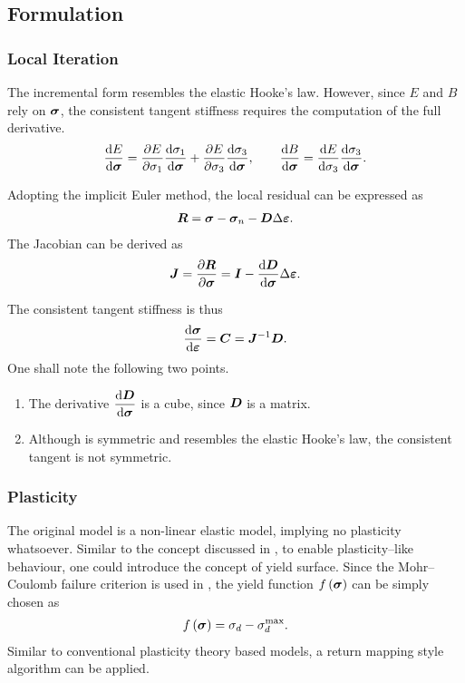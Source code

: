 \subsection{Formulation}
\subsubsection{Local Iteration}
The incremental form  resembles the elastic Hooke's law.
However, since $E$ and $B$ rely on $\bm{\sigma}$, the consistent tangent stiffness requires the computation of the full derivative.
\begin{gather}
\dfrac{\mathrm{d}E}{\mathrm{d}\bm{\sigma}}=\dfrac{\partial{E}}{\partial{\sigma_1}}\dfrac{\mathrm{d}\sigma_1}{\mathrm{d}\bm{\sigma}}+\dfrac{\partial{E}}{\partial{\sigma_3}}\dfrac{\mathrm{d}\sigma_3}{\mathrm{d}\bm{\sigma}},\qquad
\dfrac{\mathrm{d}B}{\mathrm{d}\bm{\sigma}}=\dfrac{\mathrm{d}E}{\mathrm{d}\sigma_3}\dfrac{\mathrm{d}\sigma_3}{\mathrm{d}\bm{\sigma}}.
\end{gather}

Adopting the implicit Euler method, the local residual can be expressed as
\begin{gather}
\bm{R}=\bm{\sigma}-\bm{\sigma}_n-\bm{D}\Delta\bm{\varepsilon}.
\end{gather}
The Jacobian can be derived as
\begin{gather}
\bm{J}=\dfrac{\partial{\bm{R}}}{\partial{\bm{\sigma}}}=\bm{I}-\dfrac{\mathrm{d}\bm{D}}{\mathrm{d}\bm{\sigma}}\Delta\bm{\varepsilon}.
\end{gather}

The consistent tangent stiffness is thus
\begin{gather}
\dfrac{\mathrm{d}\bm{\sigma}}{\mathrm{d}\bm{\varepsilon}}=\bm{C}=\bm{J}^{-1}\bm{D}.
\end{gather}
One shall note the following two points.
\begin{enumerate}
\item The derivative $\dfrac{\mathrm{d}\bm{D}}{\mathrm{d}\bm{\sigma}}$ is a cube, since $\bm{D}$ is a matrix.
\item Although  is symmetric and resembles the elastic Hooke's law, the consistent tangent is not symmetric.
\end{enumerate}
\subsubsection{Plasticity}
The original model is a non-linear elastic model, implying no plasticity whatsoever.
Similar to the concept discussed in \cite{Katona2015}, to enable plasticity--like behaviour, one could introduce the concept of yield surface. Since the Mohr--Coulomb failure criterion is used in , the yield function $f\left(\bm{\sigma}\right)$ can be simply chosen as
\begin{gather}
f\left(\bm{\sigma}\right)=\sigma_d-\sigma_d^\text{max}.
\end{gather}
Similar to conventional plasticity theory based models, a return mapping style algorithm can be applied.


